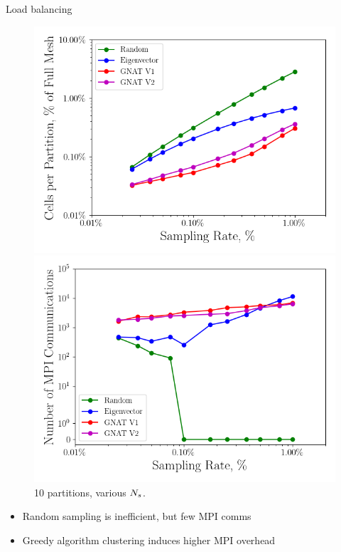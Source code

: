 \documentclass[]{beamer}
\begin{document}
\begin{frame}{Load balancing}
	\begin{figure}
		\begin{minipage}{0.49\linewidth}
			\includegraphics[width=0.99\linewidth]{Images/experiments/cvrc/cvrc_partition_stats.png}
		\end{minipage}
		\begin{minipage}{0.49\linewidth}
			\includegraphics[width=0.99\linewidth]{Images/experiments/cvrc/cvrc_partition_comms.png}
		\end{minipage}
		\caption*{10 partitions, various $N_s$.}
	\end{figure}
	\begin{itemize}
		\item Random sampling is inefficient, but few MPI comms
		\item Greedy algorithm clustering induces higher MPI overhead
	\end{itemize}
\end{frame}
\end{document}
